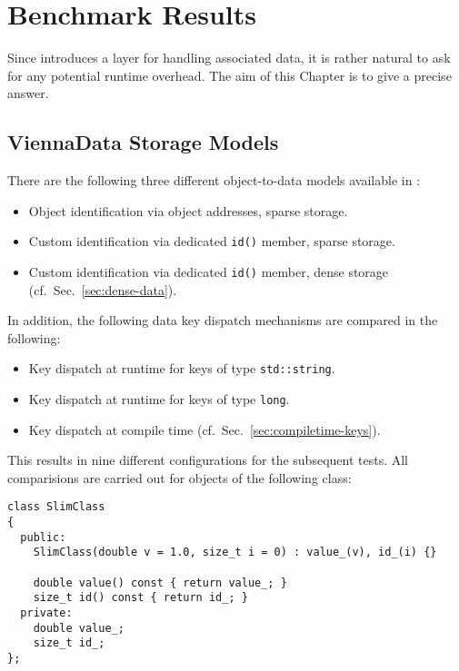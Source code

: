 \chapter{Benchmark Results} \label{chap:benchmarks}
Since {\ViennaData} introduces a layer for handling associated data, it is rather
natural to ask for any potential runtime overhead. The aim of this
Chapter is to give a precise answer.

\section{ViennaData Storage Models}
There are the following three different object-to-data models available in {\ViennaData}:
\begin{itemize}
 \item Object identification via object addresses, sparse storage.
 \item Custom identification via dedicated \lstinline|id()| member, sparse storage.
 \item Custom identification via dedicated \lstinline|id()| member, dense storage (cf.~Sec.~\ref{sec:dense-data}).
\end{itemize}
In addition, the following data key dispatch mechanisms are compared in the following:
\begin{itemize}
 \item Key dispatch at runtime for keys of type \lstinline|std::string|.
 \item Key dispatch at runtime for keys of type \lstinline|long|.
 \item Key dispatch at compile time (cf.~Sec.~\ref{sec:compiletime-keys}).
\end{itemize}
This results in nine different configurations for the subsequent tests. All comparisions are carried out for objects of the following class:
\begin{lstlisting}
class SlimClass
{
  public:
    SlimClass(double v = 1.0, size_t i = 0) : value_(v), id_(i) {}
    
    double value() const { return value_; }
    size_t id() const { return id_; }
  private:
    double value_;
    size_t id_;
};
\end{lstlisting}

